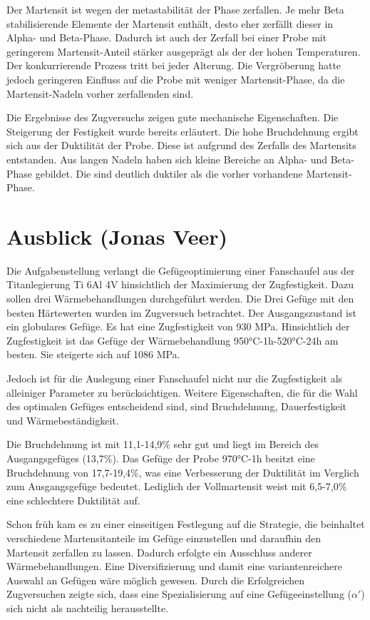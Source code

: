 \documentclass[a4paper, 11pt]{tubsreprt}
\begin{document}
Der Martensit ist wegen der metastabilität der Phase zerfallen. Je mehr Beta stabilisierende Elemente der Martensit enthält, desto eher zerfällt dieser in Alpha- und Beta-Phase. Dadurch ist auch der Zerfall bei einer Probe mit geringerem Martensit-Anteil stärker ausgeprägt als der der hohen Temperaturen. Der konkurrierende Prozess tritt bei jeder Alterung. Die Vergröberung hatte jedoch geringeren Einfluss auf die Probe mit weniger Martensit-Phase, da die Martensit-Nadeln vorher zerfallenden sind. 


Die Ergebnisse des Zugversuchs zeigen gute mechanische Eigenschaften. Die Steigerung der Festigkeit wurde bereits erläutert. Die hohe Bruchdehnung ergibt sich aus der Duktilität der Probe. Diese ist aufgrund des Zerfalls des Martensits entstanden. Aus langen Nadeln haben sich kleine Bereiche an Alpha- und Beta-Phase gebildet. Die sind deutlich duktiler als die vorher vorhandene Martensit-Phase.

\chapter{Ausblick (Jonas Veer)}
Die Aufgabenstellung verlangt die Gefügeoptimierung einer Fanschaufel aus der Titanlegierung Ti 6Al 4V hinsichtlich der Maximierung der Zugfestigkeit. Dazu sollen drei Wärmebehandlungen durchgeführt werden. Die Drei Gefüge mit den besten Härtewerten wurden im Zugversuch betrachtet. 
Der Ausgangszustand ist ein globulares Gefüge. Es hat eine Zugfestigkeit von 930 MPa. Hinsichtlich der Zugfestigkeit ist das Gefüge der Wärmebehandlung 950°C-1h-520°C-24h am besten. Sie steigerte sich auf 1086 MPa.

Jedoch ist für die Auslegung einer Fanschaufel nicht nur die Zugfestigkeit als alleiniger Parameter zu berücksichtigen. Weitere Eigenschaften, die für die Wahl des optimalen Gefüges entscheidend sind, sind Bruchdehnung, Dauerfestigkeit und Wärmebeständigkeit.

Die Bruchdehnung ist mit 11,1-14,9\% sehr gut und liegt im Bereich des Ausgangsgefüges (13,7\%). Das Gefüge der Probe 970°C-1h besitzt eine Bruchdehnung von 17,7-19,4\%, was eine Verbesserung der Duktilität im Verglich zum Ausgangsgefüge bedeutet. Lediglich der Vollmartensit weist mit 6,5-7,0\% eine schlechtere Duktilität auf. 


Schon früh kam es zu einer einseitigen Festlegung auf die Strategie, die beinhaltet verschiedene Martensitanteile im Gefüge einzustellen und daraufhin den Martensit zerfallen zu lassen. Dadurch erfolgte ein Ausschluss anderer Wärmebehandlungen. Eine Diversifizierung und damit eine variantenreichere Auswahl an Gefügen wäre möglich gewesen. Durch die Erfolgreichen Zugversuchen zeigte sich, dass eine Spezialisierung auf eine Gefügeeinstellung ($\alpha'$) sich nicht als nachteilig herausstellte. 
\end{document}
